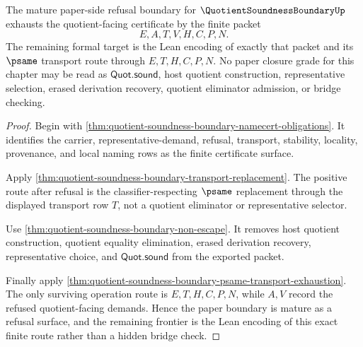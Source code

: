 \begin{theorem}
\label{thm:quotient-soundness-boundary-formal-target-frontier}
The mature paper-side refusal boundary for $\QuotientSoundnessBoundaryUp$ exhausts the quotient-facing certificate by the finite packet
$$
E,A,T,V,H,C,P,N.
$$
The remaining formal target is the Lean encoding of exactly that packet and its $\psame$ transport route through $E,T,H,C,P,N$. No paper closure grade for this chapter may be read as $\mathsf{Quot.sound}$, host quotient construction, representative selection, erased derivation recovery, quotient eliminator admission, or bridge checking.
\end{theorem}
\begin{proof}
Begin with \autoref{thm:quotient-soundness-boundary-namecert-obligations}. It identifies the carrier, representative-demand, refusal, transport, stability, locality, provenance, and local naming rows as the finite certificate surface.

Apply \autoref{thm:quotient-soundness-boundary-transport-replacement}. The positive route after refusal is the classifier-respecting $\psame$ replacement through the displayed transport row $T$, not a quotient eliminator or representative selector.

Use \autoref{thm:quotient-soundness-boundary-non-escape}. It removes host quotient construction, quotient equality elimination, erased derivation recovery, representative choice, and $\mathsf{Quot.sound}$ from the exported packet.

Finally apply \autoref{thm:quotient-soundness-boundary-psame-transport-exhaustion}. The only surviving operation route is $E,T,H,C,P,N$, while $A,V$ record the refused quotient-facing demands. Hence the paper boundary is mature as a refusal surface, and the remaining frontier is the Lean encoding of this exact finite route rather than a hidden bridge check.
\end{proof}


